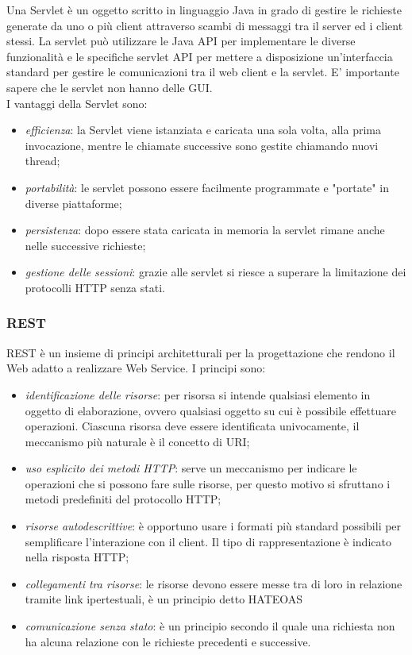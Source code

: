 Una Servlet è un oggetto scritto in linguaggio Java in grado di gestire le richieste generate da uno o più client attraverso scambi di messaggi tra il server ed i client stessi. La servlet può utilizzare le Java API per implementare le diverse funzionalità e le specifiche servlet API per mettere a disposizione un'interfaccia standard per gestire le comunicazioni tra il web client e la servlet. E' importante sapere che le servlet non hanno delle GUI.\\
I vantaggi della Servlet sono:
\begin{itemize}
	\item \textit{efficienza}: la Servlet viene istanziata e caricata una sola volta, alla prima invocazione, mentre le chiamate successive sono gestite chiamando nuovi thread;
	\item \textit{portabilità}: le servlet possono essere facilmente programmate e "portate" in diverse piattaforme;
	\item \textit{persistenza}: dopo essere stata caricata in memoria la servlet rimane anche nelle successive richieste;
	\item \textit{gestione delle sessioni}: grazie alle servlet si riesce a superare la limitazione dei protocolli HTTP senza stati.
\end{itemize}

\subsubsection{REST}

REST è un insieme di principi architetturali per la progettazione che rendono il Web adatto a realizzare Web Service. I principi sono:
\begin{itemize}
	\item \textit{identificazione delle risorse}: per risorsa si intende qualsiasi elemento in oggetto di elaborazione, ovvero qualsiasi oggetto su cui è possibile effettuare operazioni. Ciascuna risorsa deve essere identificata univocamente, il meccanismo più naturale è il concetto di URI;
	\item \textit{uso esplicito dei metodi HTTP}: serve un meccanismo per indicare le operazioni che si possono fare sulle risorse, per questo motivo si sfruttano i metodi predefiniti del protocollo HTTP;
	\item \textit{risorse autodescrittive}: è opportuno usare i formati più standard possibili per semplificare l'interazione con il client. Il tipo di rappresentazione è indicato nella risposta HTTP;
	\item \textit{collegamenti tra risorse}: le risorse devono essere messe tra di loro in relazione tramite link ipertestuali, è un principio detto HATEOAS
	\item \textit{comunicazione senza stato}: è un principio secondo il quale una richiesta non ha alcuna relazione con le richieste precedenti e successive.
\end{itemize}

